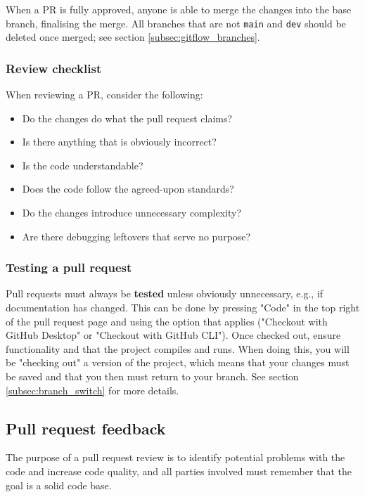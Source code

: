 \documentclass[12pt,a4paper]{article}
\begin{document}
    
        When a PR is fully approved, anyone is able to merge the changes into the base branch, finalising the merge. All branches that are not \verb|main| and \verb|dev| should be deleted once merged; see section \ref{subsec:gitflow_branches}.
    
        \subsubsection{Review checklist}
            When reviewing a PR, consider the following:
            \begin{itemize}
                \item Do the changes do what the pull request claims?
                \item Is there anything that is obviously incorrect?
                \item Is the code understandable?
                \item Does the code follow the agreed-upon standards?
                \item Do the changes introduce unnecessary complexity?
                \item Are there debugging leftovers that serve no purpose?
            \end{itemize}
    
        \subsubsection{Testing a pull request}
            Pull requests must always be \textbf{tested} unless obviously unnecessary, e.g., if documentation has changed. This can be done by pressing "Code" in the top right of the pull request page and using the option that applies ("Checkout with GitHub Desktop" or "Checkout with GitHub CLI"). Once checked out, ensure functionality and that the project compiles and runs. When doing this, you will be "checking out" a version of the project, which means that your changes must be saved and that you then must return to your branch. See section \ref{subsec:branch_switch} for more details.

    \subsection{Pull request feedback}
    \label{subsec:pr_feedback}
        The purpose of a pull request review is to identify potential problems with the code and increase code quality, and all parties involved must remember that the goal is a solid code base.
        
\end{document}

